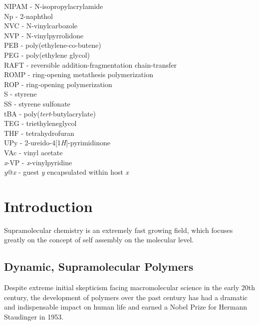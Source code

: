 \documentclass[a4paper,12pt]{report} %
\begin{document}
NIPAM - N-isopropylacrylamide\\
Np - 2-naphthol\\
NVC - N-vinylcarbozole\\
NVP - N-vinylpyrrolidone\\
PEB - poly(ethylene-co-butene)\\
PEG - poly(ethylene glycol)\\
RAFT - reversible addition-fragmentation chain-transfer\\
ROMP - ring-opening metathesis polymerization\\
ROP - ring-opening polymerization\\
S - styrene\\
SS - styrene sulfonate\\
tBA - poly({\it tert}-butylacrylate)\\
TEG - triethyleneglycol\\
THF - tetrahydrofuran\\
UPy - 2-ureido-4[1{\it H}]-pyrimidinone\\
VAc - vinyl acetate\\
{\it x}-VP - {\it x}-vinylpyridine\\
{\it y}@{\it x} - guest {\it y} encapsulated within host {\it x}


\tableofcontents







\chapter{Introduction}


Supramolecular chemistry \cite{Lehn:1995p2342, Cram:1974p2474, PEDERSEN:1988p2572} is an extremely fast growing field, which focuses greatly on the concept of self assembly on the molecular level. 




\section{Dynamic, Supramolecular Polymers}
\noindent
Despite extreme initial skepticism facing macromolecular science in the early 20th century, the development of polymers over the past century has had a dramatic and indispensable impact on human life and earned a Nobel Prize for Hermann Staudinger in 1953.\cite{Staudinger:1953p3048}
\end{document}
